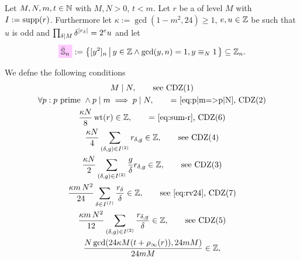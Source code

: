 \documentclass{article}
\begin{document}
\begin{Definition}
  \cite[Sect.~10]{ChenDuZhao_FindingModularFunctionsRamanujan_2019}
  \label{def:condition-co-eta-quotient-gamma1}

  Let $M, N, m, t \in \mathbb{N}$ with $M,N>0$, $t<m$.
  Let $r$ be a  of
  level $M$ with $I := \operatorname{supp}(r)$.
  Furthermore let $\kappa :=\gcd(1-m^2, 24)\ge1$,
  $e, u\in\mathbb{Z}$ be such that $u$ is odd and
  $\prod_{\delta \mid M} \delta^{\lvert r_\delta\rvert}=2^e u$ and let
  \begin{gather*}
    \defineNotation[Sbar-n]{\bar{\setS}_{n}}
    :=
    \SetDef{[y^2]_n}{y \in \setZ \land \gcd(y, n)=1, y\equiv_N 1}
    \subseteq
    \setZ_n.
  \end{gather*}

  We defne the following conditions
  \begingroup
  \def\CDZ#1{CDZ(#1)}
  \begin{gather}
    \divides{M}{N},
    \qquad
    \text{see \CDZ{1}}
    \\
    \forall p:
    p\text{ prime } \land \divides{p}{m} \implies \divides{p}{N},
    \qquad
    \text{= \eqref{eq:p|m=>p|N}, \CDZ{2}}
    \label{eq:conditionPrimeDivisors?(nn,m)}
    \\
    \frac{\kappa N}{8}  \weight(r) \in \setZ,
    \qquad
    \text{= \eqref{eq:sum-r}, \CDZ{6}}
    \label{eq:conditionSumExponentsPure?(nn,rspec,m)}
    \\
    \frac{\kappa N}{4} \sum_{(\delta,g) \in I^{(2)}} r_{\delta,g} \in \setZ,
    \qquad
    \text{see \CDZ{4}}
    \label{eq:conditionSumExponentsProperGeneralized?(nn,rspec,m)}
    \\
    \frac{\kappa N}{2} \sum_{(\delta,g) \in I^{(2)}} \frac{g}{\delta}
    r_{\delta,g}
    \in \setZ,
    \qquad
    \text{see \CDZ{3}}
    \label{eq:conditionGSigma0?(nn,rspec,m)}
    \\
    \frac{\kappa m \, N^2}{24} \sum_{\delta\in I^{(I)}}
    \frac{r_\delta}{\delta}  \in \setZ,
    \qquad
    \text{see \eqref{eq:rv24}, \CDZ{7}}
    \label{eq:conditionSigma0Pure?(nn,mm,r,m)}
    \\
    \frac{\kappa m \, N^2}{12} \sum_{(\delta,g)\in I^{(2)}}
    \frac{r_{\delta,g}}{\delta} \in \setZ,
    \qquad
    \text{see \CDZ{5}}
    \label{eq:conditionSigma0ProperGeneralized?(nn,rspec,m)}
    \\
    \frac{N \gcd(24 \kappa M (t + \rho_\infty(r)), 24 m M)}{24 m M} \in \setZ,

\end{gather}
\end{Definition}
\end{document}
